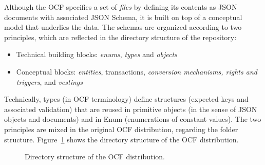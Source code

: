 
Although the OCF specifies a set of \textit{files} by defining its contents as JSON documents with associated JSON Schema, it is built on top of a conceptual model that underlies the data.
%
%
%
%
The schemas are organized according to two principles, which are reflected in the directory structure of the repository:

\begin{itemize}
	\item Technical building blocks: \textit{enums}, \textit{types} and \textit{objects}
	\item Conceptual blocks: \textit{entities}, \glspl{transaction}, \textit{conversion mechanisms, rights and triggers}, and \textit{vestings}
\end{itemize}

Technically, types (in OCF terminology) define structures (expected keys and associated validation) that are reused in primitive objects (in the sense of JSON objects and documents) and in Enum (enumerations of constant values).
%
The two principles are mixed in the original OCF distribution, regarding the folder structure.
%
Figure~\ref{fig:ocf-directory-structure} shows the directory structure of the OCF distribution.

\begin{figure}[!h]
	\caption{Directory structure of the OCF distribution.}\label{fig:ocf-directory-structure}
\end{figure}


